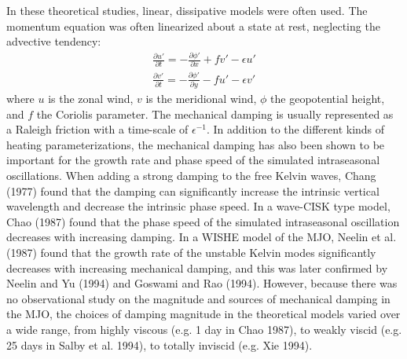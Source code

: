 \documentclass[12pt]{article}
\begin{document}
In these theoretical studies, linear, dissipative models were
often used.
The momentum equation was often linearized
about a state at rest, neglecting the advective tendency:
\begin{eqnarray}
\frac{\partial u'}{\partial t} 
= - \frac{\partial \phi '}{\partial x} + f v' - \epsilon u' 
\label{eqn_linear1}
\\
\frac{\partial v'}{\partial t} 
= - \frac{\partial \phi '}{\partial y} - f u' - \epsilon v' 
\label{eqn_linear2}
\end{eqnarray}
where $u$ is the zonal wind, $v$ is the meridional wind, 
$\phi$ the geopotential
height, and $f$ the Coriolis parameter. 
The mechanical damping is usually represented as a Raleigh friction with
a time-scale of $\epsilon^{-1}$.
In addition to the different kinds of heating parameterizations, 
the mechanical damping has also been shown to be important for
the growth rate and phase speed of the simulated intraseasonal oscillations. 
When adding a strong damping to the free Kelvin waves, 
Chang (1977) found that the damping can significantly increase
the intrinsic vertical wavelength and decrease the intrinsic phase speed.
In a wave-CISK type model, Chao (1987) found that the phase speed of the
simulated intraseasonal oscillation decreases
with increasing damping.
In a WISHE model of the MJO, 
Neelin et al. (1987) found that the growth rate 
of the unstable Kelvin modes significantly decreases with increasing
mechanical damping, and this was later confirmed by Neelin and Yu (1994)
and Goswami and Rao (1994).
However, because there was no observational study on the magnitude and sources
of mechanical damping in the MJO, 
the choices of damping magnitude in the theoretical models varied over a
wide range, from highly viscous (e.g. 1 day in Chao 1987), to weakly
viscid (e.g. 25 days in Salby et al. 1994), to totally inviscid
(e.g. Xie 1994).
\end{document}

